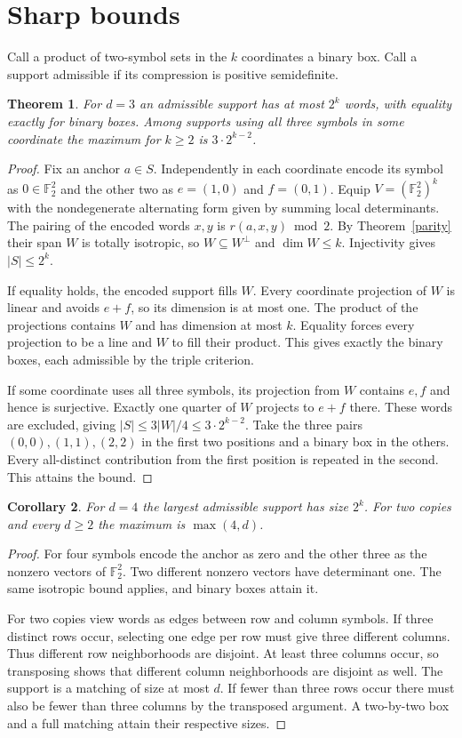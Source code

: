 \documentclass[11pt]{article}
\newtheorem{theorem}{Theorem}
\newtheorem{corollary}[theorem]{Corollary}
\newcommand{\F}{\mathbb F_2}
\begin{document}
\section{Sharp bounds}
Call a product of two-symbol sets in the $k$ coordinates a binary box. Call a support admissible if its compression is positive semidefinite.
\begin{theorem}
For $d=3$ an admissible support has at most $2^k$ words, with equality exactly for binary boxes. Among supports using all three symbols in some coordinate the maximum for $k\ge2$ is $3\cdot2^{k-2}$.
\end{theorem}
\begin{proof}
Fix an anchor $a\in S$. Independently in each coordinate encode its symbol as $0\in\F^2$ and the other two as $e=(1,0)$ and $f=(0,1)$. Equip $V=(\F^2)^k$ with the nondegenerate alternating form given by summing local determinants. The pairing of the encoded words $x,y$ is $r(a,x,y)\bmod 2$. By Theorem~\ref{parity} their span $W$ is totally isotropic, so $W\subseteq W^\perp$ and $\dim W\le k$. Injectivity gives $|S|\le2^k$.

If equality holds, the encoded support fills $W$. Every coordinate projection of $W$ is linear and avoids $e+f$, so its dimension is at most one. The product of the projections contains $W$ and has dimension at most $k$. Equality forces every projection to be a line and $W$ to fill their product. This gives exactly the binary boxes, each admissible by the triple criterion.

If some coordinate uses all three symbols, its projection from $W$ contains $e,f$ and hence is surjective. Exactly one quarter of $W$ projects to $e+f$ there. These words are excluded, giving $|S|\le3|W|/4\le3\cdot2^{k-2}$. Take the three pairs $(0,0),(1,1),(2,2)$ in the first two positions and a binary box in the others. Every all-distinct contribution from the first position is repeated in the second. This attains the bound.
\end{proof}

\begin{corollary}
For $d=4$ the largest admissible support has size $2^k$. For two copies and every $d\ge2$ the maximum is $\max(4,d)$.
\end{corollary}
\begin{proof}
For four symbols encode the anchor as zero and the other three as the nonzero vectors of $\F^2$. Two different nonzero vectors have determinant one. The same isotropic bound applies, and binary boxes attain it.

For two copies view words as edges between row and column symbols. If three distinct rows occur, selecting one edge per row must give three different columns. Thus different row neighborhoods are disjoint. At least three columns occur, so transposing shows that different column neighborhoods are disjoint as well. The support is a matching of size at most $d$. If fewer than three rows occur there must also be fewer than three columns by the transposed argument. A two-by-two box and a full matching attain their respective sizes.
\end{proof}
\end{document}
